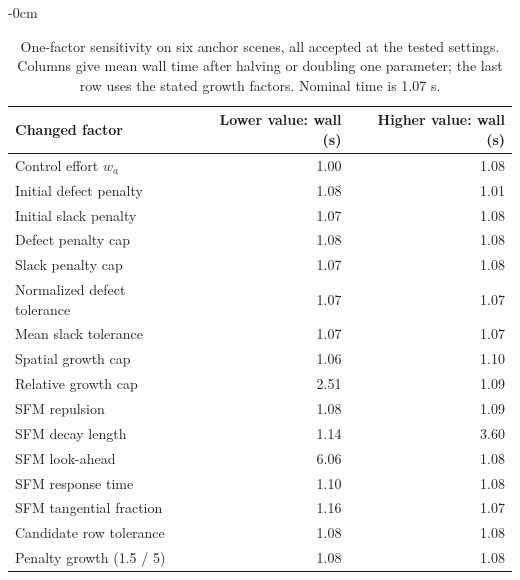 \begin{table}[htbp]
\begin{adjustwidth}{-\extralength}{0cm}
\caption{One-factor sensitivity on six anchor scenes, all accepted at the tested settings. Columns give mean wall time after halving or doubling one parameter; the last row uses the stated growth factors. Nominal time is 1.07 s.\label{tab:sensitivity-new}}
\centering\small
\begin{tabular}{lrr}\toprule
Changed factor & Lower value: wall (s) & Higher value: wall (s)\\\midrule
Control effort $w_a$ & 1.00 & 1.08\\
Initial defect penalty & 1.08 & 1.01\\
Initial slack penalty & 1.07 & 1.08\\
Defect penalty cap & 1.08 & 1.08\\
Slack penalty cap & 1.07 & 1.08\\
Normalized defect tolerance & 1.07 & 1.07\\
Mean slack tolerance & 1.07 & 1.07\\
Spatial growth cap & 1.06 & 1.10\\
Relative growth cap & 2.51 & 1.09\\
SFM repulsion & 1.08 & 1.09\\
SFM decay length & 1.14 & 3.60\\
SFM look-ahead & 6.06 & 1.08\\
SFM response time & 1.10 & 1.08\\
SFM tangential fraction & 1.16 & 1.07\\
Candidate row tolerance & 1.08 & 1.08\\
Penalty growth (1.5 / 5) & 1.08 & 1.08\\
\bottomrule\end{tabular}
\end{adjustwidth}
\end{table}
